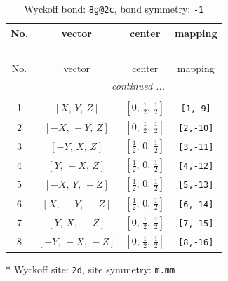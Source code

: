 \documentclass[fleqn,8pt]{jsarticle}
\begin{document}
\renewcommand{\arraystretch}{1.2}
\begin{longtable}{cccc}
\caption{Wyckoff bond: {\tt 8g@2c}, bond symmetry: {\tt -1}}
 \\
 \hline \hline
No. & vector & center & mapping \\ \hline \endfirsthead

\multicolumn{3}{l}{\tablename\ \thetable{}} \\
 \hline \hline
No. & vector & center & mapping \\ \hline \endhead

 \hline \hline
\multicolumn{3}{r}{\footnotesize\it continued ...} \\ \endfoot

 \hline \hline
\multicolumn{3}{r}{} \\ \endlastfoot

1 & $\left[ X,\, Y,\, Z \right]$ & $\left[ 0,\, \frac{1}{2},\, \frac{1}{2} \right]$ & {\tt [1,-9]} \\ \hline
2 & $\left[ - X,\, - Y,\, Z \right]$ & $\left[ 0,\, \frac{1}{2},\, \frac{1}{2} \right]$ & {\tt [2,-10]} \\ \hline
3 & $\left[ - Y,\, X,\, Z \right]$ & $\left[ \frac{1}{2},\, 0,\, \frac{1}{2} \right]$ & {\tt [3,-11]} \\ \hline
4 & $\left[ Y,\, - X,\, Z \right]$ & $\left[ \frac{1}{2},\, 0,\, \frac{1}{2} \right]$ & {\tt [4,-12]} \\ \hline
5 & $\left[ - X,\, Y,\, - Z \right]$ & $\left[ \frac{1}{2},\, 0,\, \frac{1}{2} \right]$ & {\tt [5,-13]} \\ \hline
6 & $\left[ X,\, - Y,\, - Z \right]$ & $\left[ \frac{1}{2},\, 0,\, \frac{1}{2} \right]$ & {\tt [6,-14]} \\ \hline
7 & $\left[ Y,\, X,\, - Z \right]$ & $\left[ 0,\, \frac{1}{2},\, \frac{1}{2} \right]$ & {\tt [7,-15]} \\ \hline
8 & $\left[ - Y,\, - X,\, - Z \right]$ & $\left[ 0,\, \frac{1}{2},\, \frac{1}{2} \right]$ & {\tt [8,-16]} \\
\end{longtable}
* Wyckoff site: {\tt 2d}, site symmetry: {\tt m.mm}
\renewcommand{\arraystretch}{1.2}
\end{document}
